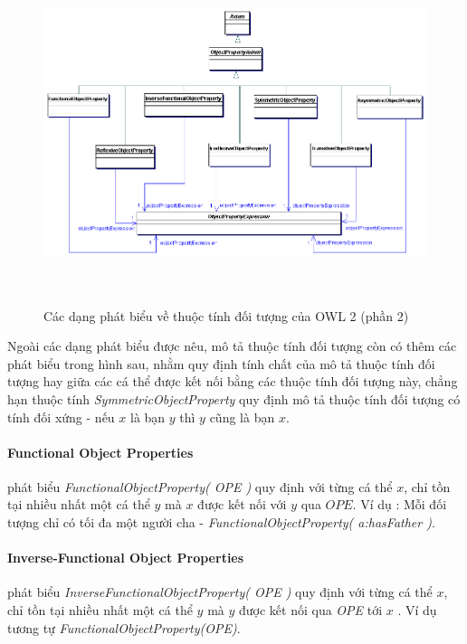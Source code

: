 \begin{figure}[h]
	\centering
	\includegraphics[width=150mm, height=100mm]{Figures/objectpropertyAxiom1.png}
	\caption{Các dạng phát biểu về thuộc tính đối tượng của OWL 2 (phần 2) \label{overflow}}
\end{figure}
Ngoài các dạng phát biểu được nêu, mô tả thuộc tính đối tượng còn có thêm các phát biểu trong hình sau, nhằm quy định tính chất của mô tả thuộc tính đối tượng hay giữa các cá thể được kết nối bằng các thuộc tính đối tượng này, chẳng hạn thuộc tính\textit{ SymmetricObjectProperty} quy định mô tả thuộc tính đối tượng có tính đối xứng - nếu $x$ là bạn $y$ thì $y$ cũng là bạn $x$. 

\paragraph{Functional Object Properties} phát biểu \textit{FunctionalObjectProperty( OPE )} quy định với từng cá thể $x$, chỉ tồn tại nhiều nhất một cá thể $y$ mà $x$ được kết nối với $y$ qua $OPE$. Ví dụ : Mỗi đối tượng chỉ có tối đa một người cha - \textit{FunctionalObjectProperty( a:hasFather )}. 


\paragraph{Inverse-Functional Object Properties} phát biểu \textit{InverseFunctionalObjectProperty( OPE )} quy định với từng cá thể $x$, chỉ tồn tại nhiều nhất một cá thể $y$ mà $y$ được kết nối qua \textit{OPE} tới $x$ . Ví dụ tương tự \textit{FunctionalObjectProperty(OPE)}.



